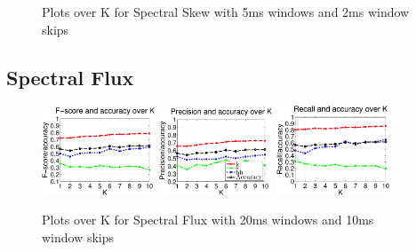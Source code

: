 {\begin{figure}
				\caption{Plots over K for Spectral Skew with 5ms windows and 2ms window skips}
		\end{figure}\clearpage
		
	
	\subsection{Spectral Flux}
		
		\begin{figure}
		
		
			\centering\includegraphics[width=0.3\textwidth]{tex/appendices/test/sflux2010FP.png}
			\centering\includegraphics[width=0.3\textwidth]{tex/appendices/test/sflux2010_P.png}
			\centering\includegraphics[width=0.3\textwidth]{tex/appendices/test/sflux2010_R.png}
			
			\caption{Plots over K for Spectral Flux with 20ms windows and 10ms window skips}
		\end{figure}
		\begin{figure}
		

\end{figure}}
